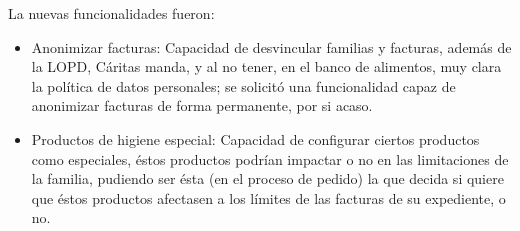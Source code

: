 \vspace{1em}
\par La nuevas funcionalidades fueron:
\begin{itemize}
    \item Anonimizar facturas: Capacidad de desvincular familias y facturas, además de la LOPD, Cáritas manda, y al no tener, en el banco de alimentos, muy clara la política de datos personales; se solicitó una funcionalidad capaz de anonimizar facturas de forma permanente, por si acaso.
    \item Productos de higiene especial: Capacidad de configurar ciertos productos como especiales, éstos productos podrían impactar o no en las limitaciones de la familia, pudiendo ser ésta (en el proceso de pedido) la que decida si quiere que éstos productos afectasen a los límites de las facturas de su expediente, o no.
\end{itemize}

